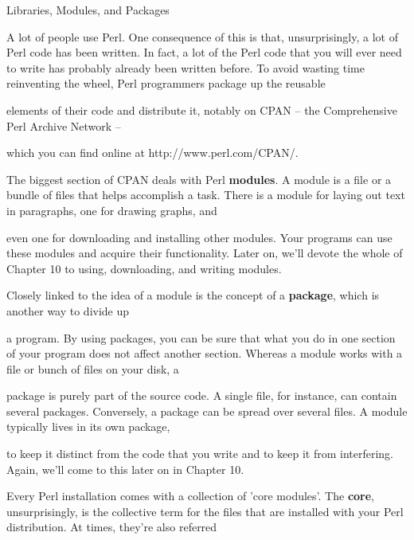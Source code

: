 \documentclass[a4paper,11pt]{book}
\begin{document}
\noindent 

\noindent Libraries, Modules, and Packages

\noindent 

\noindent A lot of people use Perl. One consequence of this is that, unsurprisingly, a lot of Perl code has been written. In fact, a lot of the Perl code that you will ever need to write has probably already been written before. To avoid wasting time reinventing the wheel, Perl programmers package up the reusable

\noindent elements of their code and distribute it, notably on CPAN -- the Comprehensive Perl Archive Network --

\noindent which you can find online at http://www.perl.com/CPAN/.

\noindent 

\noindent The biggest section of CPAN deals with Perl \textbf{modules}. A module is a file or a bundle of files that helps accomplish a task. There is a module for laying out text in paragraphs, one for drawing graphs, and

\noindent even one for downloading and installing other modules. Your programs can use these modules and acquire their functionality. Later on, we'll devote the whole of Chapter 10 to using, downloading, and writing modules.

\noindent 

\noindent 

\noindent Closely  linked to  the idea of a  module  is  the  concept  of  a  \textbf{package},  which  is  another  way to  divide  up

\noindent a  program.  By using packages,  you  can  be  sure  that  what  you  do  in  one section  of  your program  does not affect another section.  Whereas  a  module  works  with  a  file  or  bunch  of  files  on  your disk,  a

\noindent package is purely part of the source  code.  A  single  file,  for  instance,  can  contain  several  packages. Conversely,  a package  can be  spread  over  several  files.  A  module  typically  lives  in  its  own  package,

\noindent to  keep  it  distinct from the code  that  you  write  and  to  keep  it  from  interfering.  Again,  we'll  come to this  later on in  Chapter 10.

\noindent 

\noindent Every Perl installation comes with a collection of 'core modules'. The \textbf{core}, unsurprisingly, is the collective term for the files that are installed with your Perl distribution. At times, they're also referred
\end{document}
